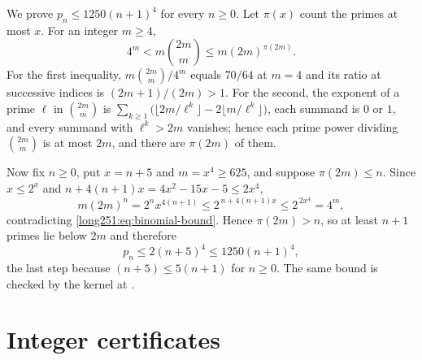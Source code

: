 \documentclass[11pt]{article}
\begin{document}
We prove $p_n\le1250(n+1)^4$ for every $n\ge0$.  Let $\pi(x)$ count the primes
at most $x$.  For an integer $m\ge4$,
\begin{equation}\label{long251:eq:binomial-bound}
 4^m<m\binom{2m}{m}\le m(2m)^{\pi(2m)} .
\end{equation}
For the first inequality, $m\binom{2m}{m}/4^{m}$ equals $70/64$ at $m=4$ and
its ratio at successive indices is $(2m+1)/(2m)>1$.  For the second, the
exponent of a prime $\ell$ in $\binom{2m}{m}$ is
$\sum_{k\ge1}\bigl(\lfloor2m/\ell^{k}\rfloor-2\lfloor m/\ell^{k}\rfloor\bigr)$,
each summand is $0$ or $1$, and every summand with $\ell^{k}>2m$ vanishes;
hence each prime power dividing $\binom{2m}{m}$ is at most $2m$, and there are
$\pi(2m)$ of them.

Now fix $n\ge0$, put $x=n+5$ and $m=x^4\ge625$, and suppose $\pi(2m)\le n$.
Since $x\le2^{x}$ and $n+4(n+1)x=4x^2-15x-5\le2x^4$,
\[
 m(2m)^{n}=2^{n}x^{4(n+1)}
 \le2^{\,n+4(n+1)x}\le2^{\,2x^4}=4^{m},
\]
contradicting \eqref{long251:eq:binomial-bound}.  Hence $\pi(2m)>n$, so at least $n+1$
primes lie below $2m$ and therefore
\[
 p_n\le2(n+5)^4\le1250(n+1)^4 ,
\]
the last step because $(n+5)\le5(n+1)$ for $n\ge0$.  The same bound is checked
by the kernel at
.

\section{Integer certificates}\label{long251:app:certificates}
\end{document}
